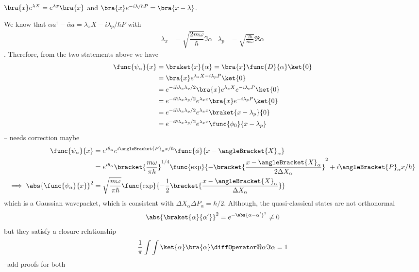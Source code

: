 \begin{lemma}
    \(\bra{x} e^{\lambda X} = e^{\lambda x} \bra{x}\) and \(\bra{x} e^{-i\lambda/\hbar P} = \bra{x - \lambda}\).
\end{lemma}
We know that \(\alpha a^{\dagger} - \overline{\alpha}a = \lambda_x X - i\lambda_p/\hbar P\) with 
\begin{align*}
    \lambda_x &= \sqrt{\dfrac{2m\omega}{\hbar}} \Im \alpha & \lambda_p &= \sqrt{\frac{2\hbar}{m\omega}} \Re \alpha
\end{align*}
. Therefore, from the two statements above we have 
\begin{align*}
    \func{\psi_{\alpha}}{x} &= \braket{x}{\alpha} = \bra{x} \func{D}{\alpha} \ket{0}\\
    &=  \bra{x} e^{\lambda_x X - i\lambda_p P}\ket{0}\\
    &= e^{-i\hbar \lambda_x \lambda_p/2} \bra{x} e^{\lambda_x X} e^{-i\lambda_p P} \ket{0}\\
    &= e^{-i\hbar \lambda_x \lambda_p/2} e^{\lambda_x x} \bra{x} e^{-i\lambda_p P} \ket{0}\\
    &= e^{-i\hbar \lambda_x \lambda_p/2} e^{\lambda_x x} \braket{x - \lambda_p}{0}\\
    &= e^{-i\hbar \lambda_x \lambda_p/2} e^{\lambda_x x} \func{\phi_0}{x - \lambda_p}
\end{align*}
-- needs correction maybe 
\begin{align*}
    \func{\psi_{\alpha}}{x} &= e^{i \theta_{\alpha}} e^{i \angleBracket{P}_{\alpha} x/\hbar} \func{\phi}{x - \angleBracket{X}_{\alpha}}\\
    &= e^{i \theta_{\alpha}} \bracket{\dfrac{m\omega}{\pi \hbar}}^{1/4} \func{\exp}{- \bracket{\dfrac{x - \angleBracket{X}_{\alpha}}{2 \Delta X_{\alpha}}}^2 + i \angleBracket{P}_{\alpha} x/\hbar}\\
    \implies \abs{\func{\psi_{\alpha}}{x}}^2 &= \sqrt{\dfrac{m\omega}{\pi \hbar}} \func{\exp}{- \frac{1}{2}\bracket{\dfrac{x - \angleBracket{X}_{\alpha}}{ \Delta X_{\alpha}}}}
\end{align*}
which is a Gaussian wavepacket, which is consistent with \(\Delta X_{\alpha} \Delta P_{\alpha} = \hbar/2 \). Although, the quasi-classical states are not orthonormal 
\begin{equation*}
    \abs{\braket{\alpha}{\alpha'}}^2 = e^{-\abs{\alpha - \alpha'}^2} \neq 0
\end{equation*}
but they satisfy a closure relationship 
\begin{equation*}
    \dfrac{1}{\pi} \int \int \ket{\alpha} \bra{\alpha} \diffOperator \Re{\alpha} \Im{\alpha} = 1
\end{equation*}
--add proofs for both

